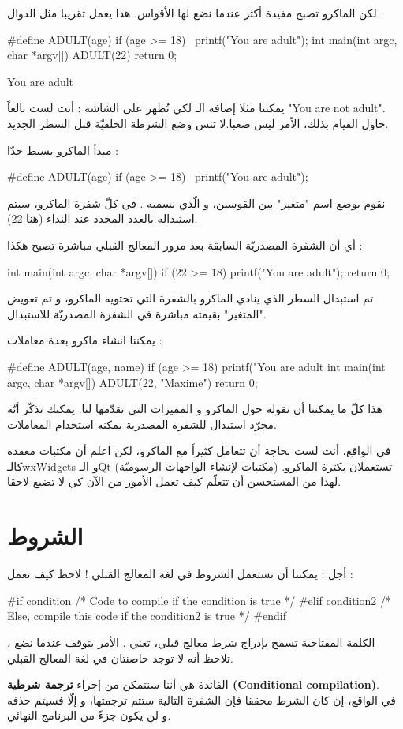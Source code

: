 لكن الماكرو تصبح مفيدة أكثر عندما نضع لها الأقواس. هذا يعمل تقريبا مثل الدوال :
\begin{Csource}
#define ADULT(age) if (age >= 18) \
                    printf("You are adult\n");
int main(int argc, char *argv[])
{
	ADULT(22)
	return 0;
}
\end{Csource}
\begin{Console}
You are adult
\end{Console}
\begin{information}
يمكننا مثلا إضافة الـ
لكي نُظهر على الشاشة : أنت لست بالغاً
"\textenglish{You are not adult}".
حاول القيام بذلك، الأمر ليس صعبا.لا تنس وضع الشرطة الخلفيّة
\InlineCode{\textbackslash}
قبل السطر الجديد.
\end{information}
مبدأ الماكرو بسيط جدّا :
\begin{Csource}
#define ADULT(age) if (age >= 18) \
                    printf("You are adult\n");
\end{Csource}
نقوم بوضع اسم "متغير" بين القوسين، و الّذي نسميه
.
في كلّ شفرة الماكرو،
\InlineCode{age}
سيتم استبداله بالعدد المحدد عند النداء (هنا 22).

أي أن الشفرة المصدريّة السابقة بعد مرور المعالج القبلي مباشرة تصبح هكذا :
\begin{Csource}
int main(int argc, char *argv[])
{
	if (22 >= 18)
		printf("You are adult\n");
	return 0;
}
\end{Csource}
تم استبدال السطر الذي ينادي الماكرو بالشفرة التي تحتويه الماكرو، و تم تعويض "المتغير"
\InlineCode{age}
بقيمته مباشرة في الشفرة المصدريّة للاستبدال.

يمكننا انشاء ماكرو بعدة معاملات :
\begin{Csource}
#define ADULT(age, name) if (age >= 18)
printf("You are adult %
int main(int argc, char *argv[])
{
	ADULT(22, "Maxime")
	return 0;
}
\end{Csource}
هذا كلّ ما يمكننا أن نقوله حول الماكرو و المميزات التي تقدّمها لنا. يمكنك تذكّر أنّه مجرّد استبدال للشفرة المصدرية يمكنه استخدام المعاملات.
\begin{information}
في الواقع، أنت لست بحاجة أن تتعامل كثيراً مع الماكرو، لكن اعلم أن مكتبات معقدة كالـ\textenglish{wxWidgets}
و الـ\textenglish{Qt}
(مكتبات لإنشاء الواجهات الرسوميّة) تستعملان بكثرة الماكرو. لهذا من المستحسن أن تتعلّم كيف تعمل الأمور من الآن كي لا تضيع لاحقا.
\end{information}

\section{الشروط}
أجل : يمكننا أن نستعمل الشروط في لغة المعالج القبلي ! لاحظ كيف تعمل :
\begin{Csource}
#if condition
  /* Code to compile if the condition is true */
#elif condition2
  /* Else, compile this code if the condition2 is true */
#endif
\end{Csource}
الكلمة المفتاحية
تسمح بإدراج شرط معالج قبلي،
تعني
.
الأمر يتوقف عندما نضع
،
تلاحظ أنه لا توجد حاضنتان في لغة المعالج القبلي.

الفائدة هي أننا سنتمكن من إجراء
\textbf{ترجمة شرطية
(\textenglish{Conditional compilation})}.\\
في الواقع، إن كان الشرط محققا فإن الشفرة التالية ستتم ترجمتها، و إلّا فسيتم حذفه و لن يكون جزءً من البرنامج النهائي.
